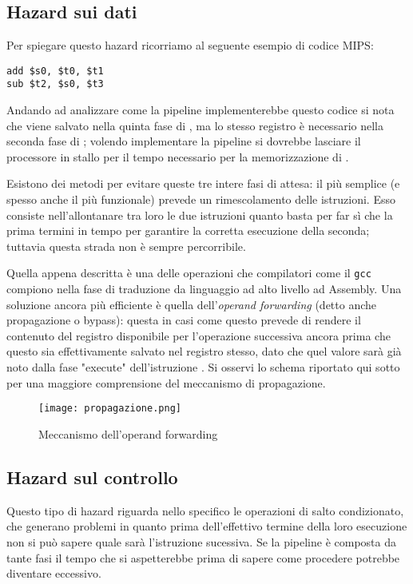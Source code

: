 \subsection{Hazard sui dati}
Per spiegare questo hazard ricorriamo al seguente esempio di codice MIPS:
\begin{verbatim}
add $s0, $t0, $t1
sub $t2, $s0, $t3
\end{verbatim}
Andando ad analizzare come la pipeline implementerebbe questo codice si nota che  viene salvato nella quinta fase di , ma lo stesso registro è necessario nella seconda fase di ; volendo implementare la pipeline si dovrebbe lasciare il processore in stallo per il tempo necessario per la memorizzazione di .

Esistono dei metodi per evitare queste tre intere fasi di attesa: il più semplice (e spesso anche il più funzionale) prevede un rimescolamento delle istruzioni. Esso consiste nell'allontanare tra loro le due istruzioni quanto basta per far sì che la prima termini in tempo per garantire la corretta esecuzione della seconda; tuttavia questa strada non è sempre percorribile.

Quella appena descritta è una delle operazioni che compilatori come il \texttt{gcc} compiono nella fase di traduzione da linguaggio ad alto livello ad Assembly. Una soluzione ancora più efficiente è quella dell'\emph{operand forwarding} (detto anche propagazione o bypass): questa in casi come questo prevede di rendere il contenuto del registro  disponibile per l'operazione successiva ancora prima che questo sia effettivamente salvato nel registro stesso, dato che quel valore sarà già noto dalla fase "execute" dell'istruzione .
Si osservi lo schema riportato qui sotto per una maggiore comprensione del meccanismo di propagazione.
\begin{figure}[H]
	\centering
	\texttt{[image: propagazione.png]}
	\caption{Meccanismo dell'operand forwarding}
\end{figure}

\subsection{Hazard sul controllo}
Questo tipo di hazard riguarda nello specifico le operazioni di salto condizionato, che generano problemi in quanto prima dell'effettivo termine della loro esecuzione non si può sapere quale sarà l'istruzione sucessiva. Se la pipeline è composta da tante fasi il tempo che si aspetterebbe prima di sapere come procedere potrebbe diventare eccessivo.

